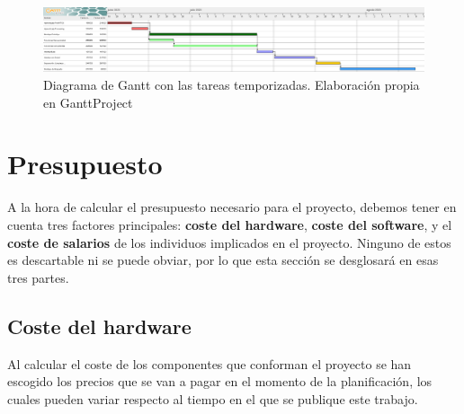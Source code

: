    \begin{figure}[h]
        \centering
        \includegraphics[width=1\textwidth]{imagenes/gantt_base.png}
        \caption{Diagrama de Gantt con las tareas temporizadas. Elaboración propia en GanttProject}
    \end{figure}
    

\section{Presupuesto}

A la hora de calcular el presupuesto necesario para el proyecto, debemos tener en cuenta tres factores principales: \textbf{coste del hardware}, \textbf{coste del software}, y el \textbf{coste de salarios} de los individuos implicados en el proyecto. Ninguno de estos es descartable ni se puede obviar, por lo que esta sección se desglosará en esas tres partes.
\subsection{Coste del hardware}

Al calcular el coste de los componentes que conforman el proyecto se han escogido los precios que se van a pagar en el momento de la planificación, los cuales pueden variar respecto al tiempo en el que se publique este trabajo. 


